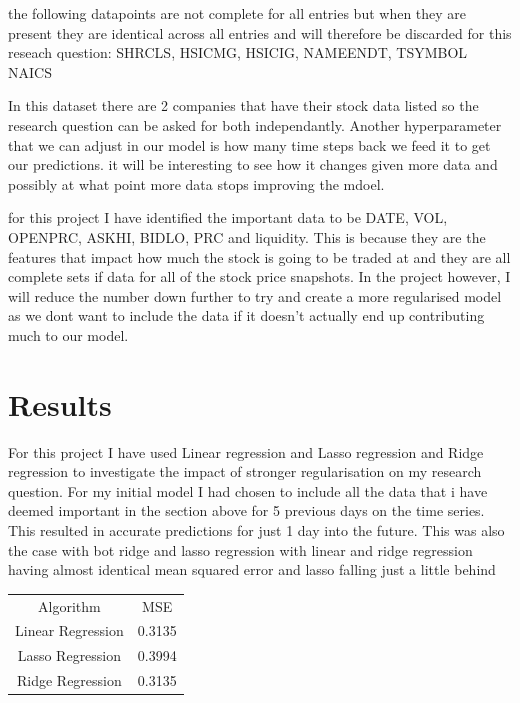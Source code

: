\documentclass{report}
\begin{document}
the following datapoints are not complete for all entries but when they are present they are identical across all entries and will therefore be discarded for this reseach question: SHRCLS, HSICMG, HSICIG, NAMEENDT, TSYMBOL NAICS

In this dataset there are 2 companies that have their stock data listed so the research question can be asked for both independantly. Another hyperparameter that we can adjust in our model is how many time steps back we feed it to get our predictions. it will be interesting to see how it changes given more data and possibly at what point more data stops improving the mdoel.


for this project I have identified the important data to be DATE, VOL, OPENPRC, ASKHI, BIDLO, PRC and liquidity. This is because they are the features that impact how much the stock is going to be traded at and they are all complete sets if data for all of the stock price snapshots. In the project however, I will reduce the number down further to try and create a more regularised model as we dont want to include the data if it doesn't actually end up contributing much to our model.

\section{Results}

For this project I have used Linear regression and Lasso regression and Ridge regression to investigate the impact of stronger regularisation on my research question.
For my initial model I had chosen to include all the data that i have deemed important in the section above for 5 previous days on the time series. This resulted in accurate predictions for just 1 day into the future. This was also the case with bot ridge and lasso regression with linear and ridge regression having almost identical mean squared error and lasso falling just a little behind

\begin{minipage} {\linewidth}
\bigskip
\centering
{}
\begin{tabular}{c c}
    Algorithm & MSE \\
    Linear Regression & 0.3135 \\
    Lasso Regression & 0.3994 \\
    Ridge Regression & 0.3135
\end{tabular}
\bigskip
\end{minipage}
\end{document}
